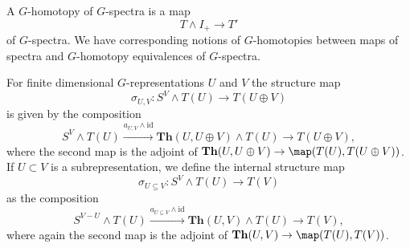 \begin{mydef}
A $G$-homotopy of $G$-spectra is a map
\[
T\wedge I_+\to T'
\]
of $G$-spectra. We have corresponding notions of $G$-homotopies
between maps of spectra and $G$-homotopy equivalences of $G$-spectra.
\end{mydef}



\begin{mydef}
For finite dimensional $G$-representations $U$ and $V$ the structure map
\begin{equation}\label{eq:structuremap}
\sigma_{U,V}: S^V\wedge T(U)\to T(U\oplus V)
\end{equation}
is given by the composition
\[
S^V\wedge T(U)\xrightarrow{a_{U,V}\wedge\mathrm{id}}
\mathbf{Th}(U, U\oplus V)\wedge T(U)\to T(U\oplus V),
\]
where the second map is the adjoint of $\mathbf{Th}(U,U\oplus V)\to\map(T(U), T(U\oplus V))$.
If $U\subset V$ is a subrepresentation, we define the internal structure map
\begin{equation}\label{eq:internalstructuremap}
\sigma_{U\subseteq V}: S^V\wedge T(U)\to T(V)
\end{equation}
as the composition
\[
S^{V-U}\wedge T(U)\xrightarrow{a_{U\subseteq V}\wedge\mathrm{id}}
\mathbf{Th}(U, V)\wedge T(U)\to T(V),
\]
where again the second map is the adjoint of $\mathbf{Th}(U,V)\to\map(T(U), T(V))$.
\end{mydef}
%
%
%

